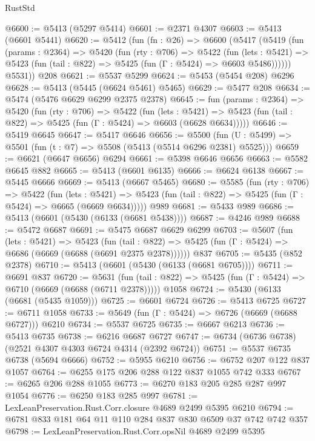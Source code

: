 \begin{lexlean}{RustStd}
\begin{coremodule}
@6600 := @5413 (@5297 @5414)
@6601 := @2371 @4307
@6603 := @5413 (@6601 @5441)
@6620 := @5412
    (fun (fn : @26) =>
    @6600
      (@5417
        (@5419
          (fun (params : @2364) =>
          @5420
            (fun (rty : @706) =>
            @5422
              (fun (lets : @5421) =>
              @5423 (fun (tail : @822) => @5425 (fun (Γ : @5424) => @6603 @5486))))))
        @5531))
    @208
@6621 := @5537 @5299
@6624 := @5453 (@5454 @208) @6296
@6628 := @5413 (@5445 (@6624 @5461) @5465)
@6629 := @5477 @208
@6634 := @5474 (@5476 @6629 @6299 @2375 @2378)
@6645 := fun (params : @2364) =>
  @5420
    (fun (rty : @706) =>
    @5422
      (fun (lets : @5421) =>
      @5423 (fun (tail : @822) => @5425 (fun (Γ : @5424) => @6603 (@6628 @6634)))))
@6646 := @5419 @6645
@6647 := @5417 @6646
@6656 := @5500 (fun (U : @5499) => @5501 (fun (t : @7) => @5508 (@5413 (@5514 @6296 @2381) @5525)))
@6659 := @6621 (@6647 @6656) @6294
@6661 := @5398 @6646 @6656
@6663 := @5582 @6645 @882
@6665 := @5413 (@6601 @6135)
@6666 := @6624 @6138
@6667 := @5445 @6666
@6669 := @5413 (@6667 @5465)
@6680 := @5585
    (fun (rty : @706) =>
    @5422
      (fun (lets : @5421) =>
      @5423 (fun (tail : @822) => @5425 (fun (Γ : @5424) => @6665 (@6669 @6634)))))
    @989
@6681 := @5433 @989
@6686 := @5413 (@6601 (@5430 (@6133 (@6681 @5438))))
@6687 := @4246 @989
@6688 := @5472 @6687
@6691 := @5475 @6687 @6629 @6299
@6703 := @5607
    (fun (lets : @5421) =>
    @5423
      (fun (tail : @822) => @5425 (fun (Γ : @5424) => @6686 (@6669 (@6688 (@6691 @2375 @2378))))))
    @837
@6705 := @5435 (@852 @2378)
@6710 := @5413 (@6601 (@5430 (@6133 (@6681 @6705))))
@6711 := @6691 @837
@6720 := @5631
    (fun (tail : @822) => @5425 (fun (Γ : @5424) => @6710 (@6669 (@6688 (@6711 @2378)))))
    @1058
@6724 := @5430 (@6133 (@6681 (@5435 @1059)))
@6725 := @6601 @6724
@6726 := @5413 @6725
@6727 := @6711 @1058
@6733 := @5649 (fun (Γ : @5424) => @6726 (@6669 (@6688 @6727))) @6210
@6734 := @5537 @6725
@6735 := @6667 @6213
@6736 := @5413 @6735
@6738 := @6216 @6687 @6727
@6747 := @6734 (@6736 @6738) (@2521 @4307 @4303 @6724 @4314 (@2392 @6724))
@6751 := @5537 @6735 @6738 (@5694 @6666)
@6752 := @5955 @6210
@6756 := @6752 @207 @122 @837 @1057
@6764 := @6255 @175 @206 @288 @122 @837 @1055 @742 @333
@6767 := @6265 @206 @288 @1055
@6773 := @6270 @183 @205 @285 @287 @997 @1054
@6776 := @6250 @183 @285 @997
@6781 := LexLeanPreservation.Rust.Corr.closure @4689 @2499 @5395 @6210
@6794 := @6781 @833 @181 @64 @11 @110 @284 @837 @830 @6509 @37 @742 @742 @357
@6798 := LexLeanPreservation.Rust.Corr.opsNil @4689 @2499 @5395

\end{coremodule}
\end{lexlean}
